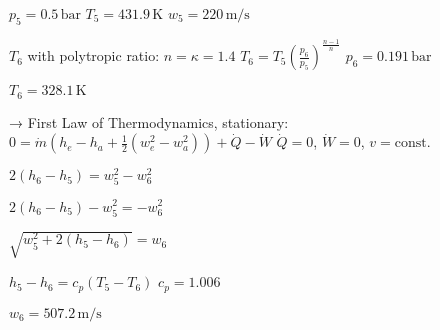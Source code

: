 \( p_5 = 0.5 \, \text{bar} \)  
\( T_5 = 431.9 \, \text{K} \)  
\( w_5 = 220 \, \text{m/s} \)  

\( T_6 \) with polytropic ratio: \( n = \kappa = 1.4 \)  
\( T_6 = T_5 \left( \frac{p_6}{p_5} \right)^{\frac{n-1}{n}} \)  
\( p_6 = 0.191 \, \text{bar} \)  

\( T_6 = 328.1 \, \text{K} \)  

→ First Law of Thermodynamics, stationary:  
\( 0 = \dot{m} \left( h_e - h_a + \frac{1}{2} (w_e^2 - w_a^2) \right) + \dot{Q} - \dot{W} \)  
\( \dot{Q} = 0 \), \( \dot{W} = 0 \), \( v = \text{const.} \)  

\( 2(h_6 - h_5) = w_5^2 - w_6^2 \)  

\( 2(h_6 - h_5) - w_5^2 = -w_6^2 \)  

\( \sqrt{w_5^2 + 2(h_5 - h_6)} = w_6 \)  

\( h_5 - h_6 = c_p (T_5 - T_6) \)  
\( c_p = 1.006 \)  

\( w_6 = 507.2 \, \text{m/s} \)